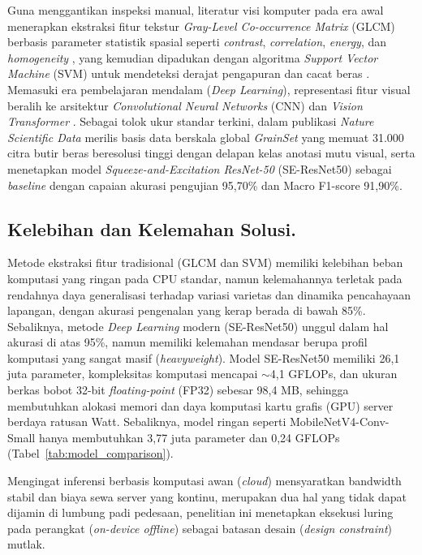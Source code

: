 \documentclass[12pt,a4paper]{article}
\begin{document}
\indent Guna menggantikan inspeksi manual, literatur visi komputer pada era awal menerapkan ekstraksi fitur tekstur 
\textit{Gray-Level Co-occurrence Matrix} (GLCM) berbasis parameter statistik spasial seperti \textit{contrast},
\textit{correlation}, \textit{energy}, dan \textit{homogeneity} \autocite{haralick1973}, 
yang kemudian dipadukan dengan algoritma \textit{Support Vector Machine} (SVM) untuk mendeteksi derajat pengapuran dan cacat beras \autocite{sun2014chalkiness}.
Memasuki era pembelajaran mendalam (\textit{Deep Learning}), representasi fitur visual beralih ke arsitektur \textit{Convolutional Neural Networks} (CNN) 
dan \textit{Vision Transformer} \autocite{chen2024swin}. Sebagai tolok ukur standar terkini, \textcite{fan2023grainset} 
dalam publikasi \textit{Nature Scientific Data} merilis basis data berskala global \textit{GrainSet} yang memuat 31.000 
citra butir beras beresolusi tinggi dengan delapan kelas anotasi mutu visual, serta menetapkan model \textit{Squeeze-and-Excitation ResNet-50}
(SE-ResNet50) sebagai \textit{baseline} dengan capaian akurasi pengujian 95,70\% dan Macro F1-score 91,90\%.

\subsection*{Kelebihan dan Kelemahan Solusi.} 

\indent Metode ekstraksi fitur tradisional (GLCM dan SVM) memiliki kelebihan beban komputasi yang ringan pada CPU standar, 
namun kelemahannya terletak pada rendahnya daya generalisasi terhadap variasi varietas dan dinamika pencahayaan lapangan,
dengan akurasi pengenalan yang kerap berada di bawah 85\%. Sebaliknya, metode \textit{Deep Learning} modern (SE-ResNet50) unggul
dalam hal akurasi di atas 95\%, namun memiliki kelemahan mendasar berupa profil komputasi yang sangat masif (\textit{heavyweight}). 
Model SE-ResNet50 memiliki 26,1 juta parameter, kompleksitas komputasi mencapai $\sim$4,1 GFLOPs, dan ukuran berkas bobot 32-bit
\textit{floating-point} (FP32) sebesar 98,4 MB, sehingga membutuhkan alokasi memori dan daya komputasi kartu grafis (GPU) server berdaya ratusan Watt.
Sebaliknya, model ringan seperti MobileNetV4-Conv-Small hanya membutuhkan 3,77 juta parameter dan 0,24 GFLOPs (Tabel~\ref{tab:model_comparison}).

Mengingat inferensi berbasis komputasi awan (\textit{cloud}) mensyaratkan bandwidth stabil dan biaya sewa server
yang kontinu, merupakan dua hal yang tidak dapat dijamin di lumbung padi pedesaan, penelitian ini menetapkan eksekusi luring pada perangkat
(\textit{on-device offline}) sebagai batasan desain (\textit{design constraint}) mutlak.
\end{document}
